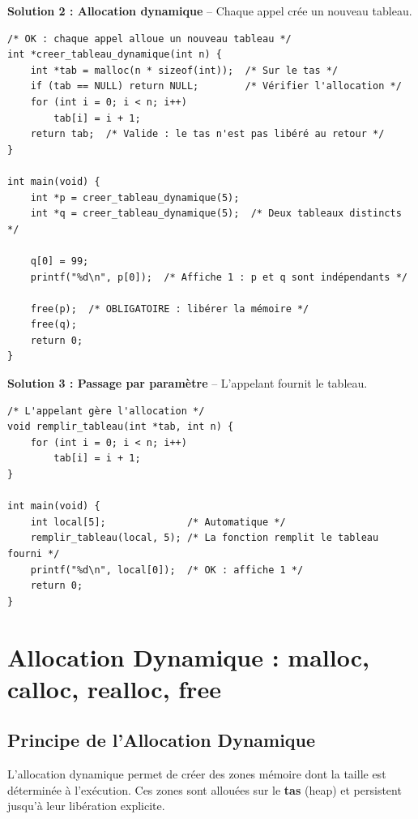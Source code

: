 \documentclass[10pt,a4paper]{article}
\begin{document}
\textbf{Solution 2 : Allocation dynamique} -- Chaque appel crée un nouveau tableau.

\begin{lstlisting}
/* OK : chaque appel alloue un nouveau tableau */
int *creer_tableau_dynamique(int n) {
    int *tab = malloc(n * sizeof(int));  /* Sur le tas */
    if (tab == NULL) return NULL;        /* Vérifier l'allocation */
    for (int i = 0; i < n; i++)
        tab[i] = i + 1;
    return tab;  /* Valide : le tas n'est pas libéré au retour */
}

int main(void) {
    int *p = creer_tableau_dynamique(5);
    int *q = creer_tableau_dynamique(5);  /* Deux tableaux distincts */
    
    q[0] = 99;
    printf("%d\n", p[0]);  /* Affiche 1 : p et q sont indépendants */
    
    free(p);  /* OBLIGATOIRE : libérer la mémoire */
    free(q);
    return 0;
}
\end{lstlisting}

\textbf{Solution 3 : Passage par paramètre} -- L'appelant fournit le tableau.

\begin{lstlisting}
/* L'appelant gère l'allocation */
void remplir_tableau(int *tab, int n) {
    for (int i = 0; i < n; i++)
        tab[i] = i + 1;
}

int main(void) {
    int local[5];              /* Automatique */
    remplir_tableau(local, 5); /* La fonction remplit le tableau fourni */
    printf("%d\n", local[0]);  /* OK : affiche 1 */
    return 0;
}
\end{lstlisting}

\section{Allocation Dynamique : malloc, calloc, realloc, free}

\subsection{Principe de l'Allocation Dynamique}

L'allocation dynamique permet de créer des zones mémoire dont la taille est déterminée à l'exécution. Ces zones sont allouées sur le \textbf{tas} (heap) et persistent jusqu'à leur libération explicite.
\end{document}
